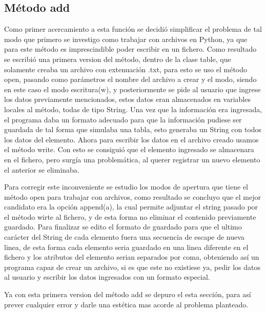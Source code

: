 \documentclass[conference]{IEEEtran}
\begin{document}
\subsection{Método add}
Como primer acercamiento a esta función se decidió simplificar el problema de tal modo que primero se investigo como trabajar con archivos en Python\cite{AP}, ya que para este método es imprescindible poder escribir en un fichero. Como resultado se escribió una primera version del método, dentro de la clase table, que solamente creaba un archivo con extenuación .txt, para esto se uso el método open, pasando como parámetros el nombre del archivo a crear y el modo, siendo en este caso el modo escritura(w), y posteriormente se pide al usuario que ingrese los datos previamente mencionados, estos datos eran almacenados en variables locales al método, todas de tipo String. Una vez que la información era ingresada, el programa daba un formato adecuado para que la información pudiese ser guardada de tal forma que simulaba una tabla\cite{Redhat}, esto generaba un String con todos los datos del elemento. Ahora para escribir los datos en el archivo creado usamos el método write. Con esto se consiguió que el elemento ingresado se almacenara en el fichero, pero surgía una problemática, al querer registrar un nuevo elemento el anterior se eliminaba.\par

Para corregir este inconveniente se estudio los modos de apertura que tiene el método open para trabajar con archivos\cite{docPy}, como resultado se concluyo que el mejor candidato era la opción append(a), la cual permite adjuntar el string pasado por el método wirte al fichero, y de esta forma no eliminar el contenido previamente guardado. Para finalizar se edito el formato de guardado para que el ultimo carácter del String de cada elemento fuera una secuencia de escape de nueva linea, de esta forma cada elemento seria guardado en una linea diferente en el fichero y los atributos del elemento serian separados por coma, obteniendo así un programa capaz de crear un archivo, si es que este no existiese ya, pedir los datos al usuario y escribir los datos ingresados con un formato especial.\par

Ya con esta primera version del método add se depuro el esta sección, para así prever cualquier error y darle una estética mas acorde al problema planteado.\par
 
\end{document}

